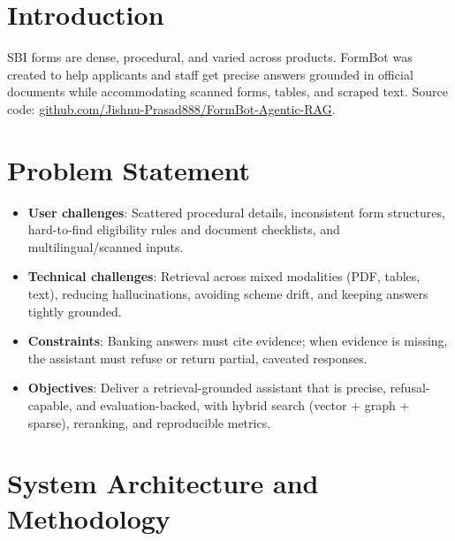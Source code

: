 \documentclass[11pt,a4paper]{article}
\begin{document}
\section{Introduction}

SBI forms are dense, procedural, and varied across products. FormBot was created to help applicants and staff get precise answers grounded in official documents while accommodating scanned forms, tables, and scraped text. Source code: \href{https://github.com/Jishnu-Prasad888/FormBot-Agentic-RAG}{github.com/Jishnu-Prasad888/FormBot-Agentic-RAG}.

\section{Problem Statement}

\begin{itemize}[leftmargin=1.2cm]
    \item \textbf{User challenges}: Scattered procedural details, inconsistent form structures, hard-to-find eligibility rules and document checklists, and multilingual/scanned inputs.
    \item \textbf{Technical challenges}: Retrieval across mixed modalities (PDF, tables, text), reducing hallucinations, avoiding scheme drift, and keeping answers tightly grounded.
    \item \textbf{Constraints}: Banking answers must cite evidence; when evidence is missing, the assistant must refuse or return partial, caveated responses.
    \item \textbf{Objectives}: Deliver a retrieval-grounded assistant that is precise, refusal-capable, and evaluation-backed, with hybrid search (vector + graph + sparse), reranking, and reproducible metrics.
\end{itemize}

\section{System Architecture and Methodology}
\end{document}
